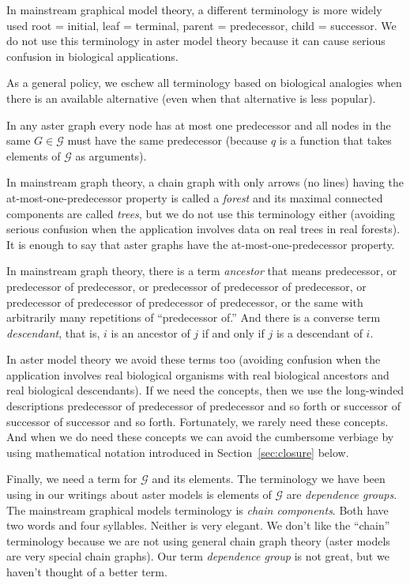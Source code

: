 In mainstream graphical model theory, a different terminology is more widely
used \citep{lauritzen} root = initial, leaf = terminal, parent = predecessor,
child = successor.  We do not use this terminology in aster model theory
because it can cause serious confusion in biological applications.

As a general policy, we eschew all terminology based on biological analogies
when there is an available alternative (even when that alternative is less
popular).

In any aster graph every node has at most one predecessor and all nodes in
the same $G \in \mathcal{G}$ must have the same predecessor (because $q$
is a function that takes elements of $\mathcal{G}$ as arguments).

In mainstream graph theory, a chain graph with only arrows (no lines) having
the at-most-one-predecessor property is called a \emph{forest} and its maximal
connected components are called \emph{trees}, but we do not use this terminology
either (avoiding serious confusion when the application involves data on
real trees in real forests).  It is enough to say that aster graphs
have the at-most-one-predecessor property.

In mainstream graph theory, there is a term \emph{ancestor} that means
predecessor, or predecessor of predecessor,
or predecessor of predecessor of predecessor,
or predecessor of predecessor of predecessor of predecessor,
or the same with arbitrarily many repetitions of ``predecessor of.''
And there is a converse term \emph{descendant}, that is, $i$ is an ancestor
of $j$ if and only if $j$ is a descendant of $i$.

In aster model theory we avoid these terms too (avoiding confusion when
the application involves real biological organisms with real biological
ancestors and real biological descendants).  If we need the concepts,
then we use the long-winded descriptions
predecessor of predecessor of predecessor and so forth or
successor of successor of successor and so forth.
Fortunately, we rarely need these concepts.
And when we do need these concepts we can avoid the cumbersome verbiage
by using mathematical notation introduced in Section~\ref{sec:closure}
below.

Finally, we need a term for $\mathcal{G}$ and its elements.
The terminology we have been using in our writings about aster models is
elements of $\mathcal{G}$ are \emph{dependence groups}.
The mainstream graphical models terminology \citep{lauritzen} is
\emph{chain components}.  Both have two words and four syllables.
Neither is very elegant.  We don't like the ``chain'' terminology because
we are not using general chain graph theory (aster models are very special
chain graphs).  Our term \emph{dependence group} is not great, but we haven't
thought of a better term.

